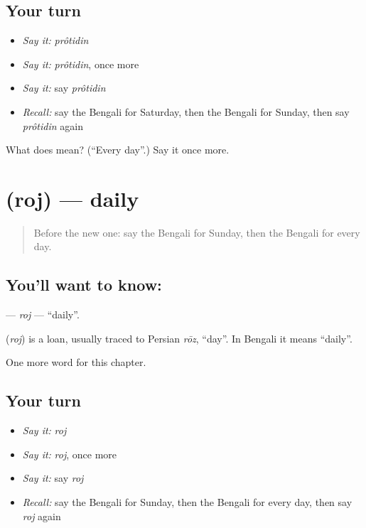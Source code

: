 \subsection*{Your turn}
\begin{itemize}
\raggedright
  \item \emph{Say it:} \emph{prôtidin}
  \item \emph{Say it:} \emph{prôtidin}, once more
  \item \emph{Say it:} say \emph{prôtidin}
  \item \emph{Recall:} say the Bengali for Saturday, then the Bengali for Sunday, then say \emph{prôtidin} again
\end{itemize}

\begin{tcolorbox}[breakable,colback=teal!4,colframe=teal!35!black,title={Before you move on}]
What does  mean? (\textquotedblleft{}Every day\textquotedblright{}.) Say it once more.
\end{tcolorbox}
\section[\texorpdfstring{\bn{রোজ} (roj)}{রোজ (roj)}]{ (roj) — daily}

\label{lesson:BN-C92-roj}



\begin{quote}
Before the new one: say the Bengali for Sunday, then the Bengali for every day.
\end{quote}

\subsection*{You'll want to know: }
\textbf{} — \emph{roj} — \textquotedblleft{}daily\textquotedblright{}.

\begin{cousinweb}
\textbf{} (\emph{roj}) is a loan, usually traced to Persian \emph{rōz}, \textquotedblleft{}day\textquotedblright{}. In Bengali it means \textquotedblleft{}daily\textquotedblright{}.
\end{cousinweb}

\begin{grammarlens}[title={What you've built}]
One more word for this chapter.
\end{grammarlens}

\subsection*{Your turn}
\begin{itemize}
\raggedright
  \item \emph{Say it:} \emph{roj}
  \item \emph{Say it:} \emph{roj}, once more
  \item \emph{Say it:} say \emph{roj}
  \item \emph{Recall:} say the Bengali for Sunday, then the Bengali for every day, then say \emph{roj} again
\end{itemize}


